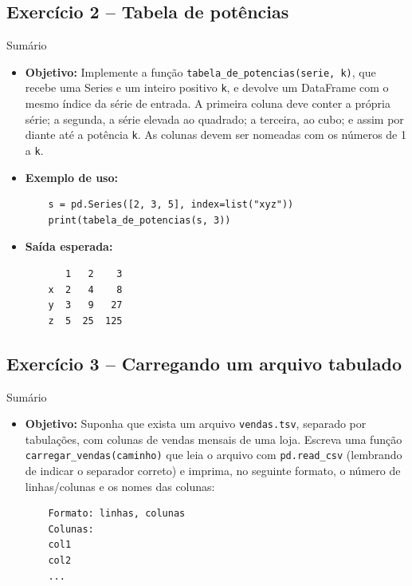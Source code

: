 \documentclass[11pt,a4paper]{article}
\begin{document}
\subsection*{Exercício 2 -- Tabela de potências}
\begin{exercicio}{Sumário}
\begin{itemize}
    \item \textbf{Objetivo:} Implemente a função \texttt{tabela\_de\_potencias(serie, k)}, que recebe uma Series e um inteiro positivo \texttt{k}, e devolve um DataFrame com o mesmo índice da série de entrada. A primeira coluna deve conter a própria série; a segunda, a série elevada ao quadrado; a terceira, ao cubo; e assim por diante até a potência \texttt{k}. As colunas devem ser nomeadas com os números de 1 a \texttt{k}.
    \item \textbf{Exemplo de uso:}
    \begin{lstlisting}
    s = pd.Series([2, 3, 5], index=list("xyz"))
    print(tabela_de_potencias(s, 3))
    \end{lstlisting}
    \item \textbf{Saída esperada:}
    \begin{verbatim}
       1   2    3
    x  2   4    8
    y  3   9   27
    z  5  25  125
    \end{verbatim}
\end{itemize}
\end{exercicio}

\subsection*{Exercício 3 -- Carregando um arquivo tabulado}
\begin{exercicio}{Sumário}
\begin{itemize}
    \item \textbf{Objetivo:} Suponha que exista um arquivo \texttt{vendas.tsv}, separado por tabulações, com colunas de vendas mensais de uma loja. Escreva uma função \texttt{carregar\_vendas(caminho)} que leia o arquivo com \texttt{pd.read\_csv} (lembrando de indicar o separador correto) e imprima, no seguinte formato, o número de linhas/colunas e os nomes das colunas:
    \begin{verbatim}
    Formato: linhas, colunas
    Colunas:
    col1
    col2
    ...
    \end{verbatim}
\end{itemize}
\end{exercicio}
\end{document}

